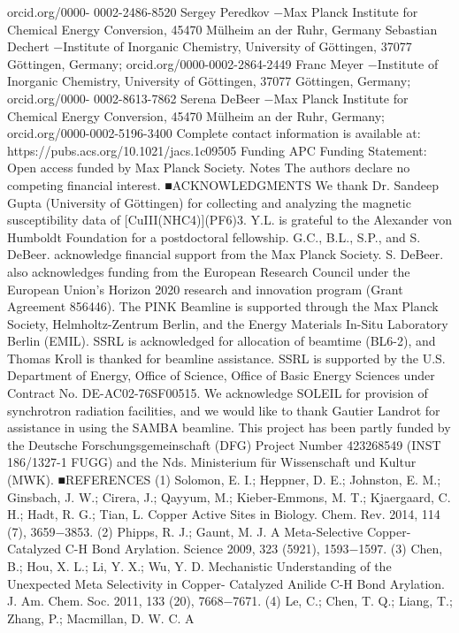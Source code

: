 \documentclass{article}
\begin{document}
orcid.org/0000-
0002-2486-8520
Sergey Peredkov −Max Planck Institute for Chemical Energy
Conversion, 45470 Mülheim an der Ruhr, Germany
Sebastian Dechert −Institute of Inorganic Chemistry,
University of Göttingen, 37077 Göttingen, Germany;
orcid.org/0000-0002-2864-2449
Franc Meyer −Institute of Inorganic Chemistry, University of
Göttingen, 37077 Göttingen, Germany;
orcid.org/0000-
0002-8613-7862
Serena DeBeer −Max Planck Institute for Chemical Energy
Conversion, 45470 Mülheim an der Ruhr, Germany;
orcid.org/0000-0002-5196-3400
Complete contact information is available at:
https://pubs.acs.org/10.1021/jacs.1c09505
Funding
APC Funding Statement: Open access funded by Max Planck
Society.
Notes
The authors declare no competing ﬁnancial interest.
■ACKNOWLEDGMENTS
We thank Dr. Sandeep Gupta (University of Göttingen) for
collecting and analyzing the magnetic susceptibility data of
[CuIII(NHC4)](PF6)3. Y.L. is grateful to the Alexander von
Humboldt Foundation for a postdoctoral fellowship. G.C.,
B.L., S.P., and S. DeBeer. acknowledge ﬁnancial support from
the Max Planck Society. S. DeBeer. also acknowledges funding
from the European Research Council under the European
Union’s Horizon 2020 research and innovation program
(Grant Agreement 856446). The PINK Beamline is supported
through the Max Planck Society, Helmholtz-Zentrum Berlin,
and the Energy Materials In-Situ Laboratory Berlin (EMIL).
SSRL is acknowledged for allocation of beamtime (BL6-2),
and Thomas Kroll is thanked for beamline assistance. SSRL is
supported by the U.S. Department of Energy, Oﬃce of
Science, Oﬃce of Basic Energy Sciences under Contract No.
DE-AC02-76SF00515. We acknowledge SOLEIL for provision
of synchrotron radiation facilities, and we would like to thank
Gautier Landrot for assistance in using the SAMBA beamline.
This project has been partly funded by the Deutsche
Forschungsgemeinschaft (DFG) Project Number 423268549
(INST 186/1327-1 FUGG) and the Nds. Ministerium für
Wissenschaft und Kultur (MWK).
■REFERENCES
(1) Solomon, E. I.; Heppner, D. E.; Johnston, E. M.; Ginsbach, J. W.;
Cirera, J.; Qayyum, M.; Kieber-Emmons, M. T.; Kjaergaard, C. H.;
Hadt, R. G.; Tian, L. Copper Active Sites in Biology. Chem. Rev. 2014,
114 (7), 3659−3853.
(2) Phipps, R. J.; Gaunt, M. J. A Meta-Selective Copper-Catalyzed
C-H Bond Arylation. Science 2009, 323 (5921), 1593−1597.
(3) Chen, B.; Hou, X. L.; Li, Y. X.; Wu, Y. D. Mechanistic
Understanding of the Unexpected Meta Selectivity in Copper-
Catalyzed Anilide C-H Bond Arylation. J. Am. Chem. Soc. 2011, 133
(20), 7668−7671.
(4) Le, C.; Chen, T. Q.; Liang, T.; Zhang, P.; Macmillan, D. W. C. A
\end{document}
